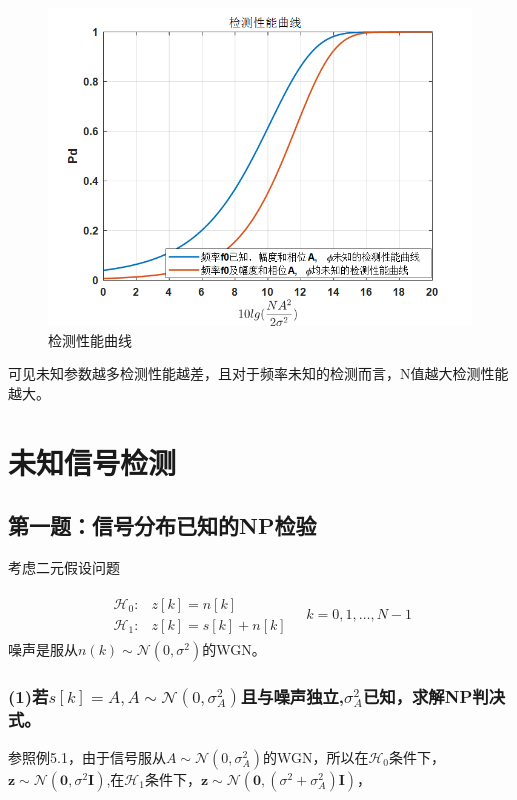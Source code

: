 \documentclass[fontset=windows]{article}
\numberwithin{figure}{section}
\begin{document}
\begin{figure}[H]
	\centering
	\includegraphics[scale=0.7]{4.3.png}
	\caption{检测性能曲线}
	\label{6.4.3}
\end{figure}

可见未知参数越多检测性能越差，且对于频率未知的检测而言，N值越大检测性能越大。

\section{未知信号检测}
\subsection{第一题：信号分布已知的NP检验}
考虑二元假设问题

\begin{align*}
	\begin{matrix}
		\mathcal{H}_0: & z[k]=n[k]      \\
		\mathcal{H}_1: & z[k]=s[k]+n[k]
	\end{matrix}\quad k=0,1,\ldots,N-1
\end{align*}
噪声是服从\(n(k)\sim \mathcal{N}(0,\sigma^2)\)的WGN。

\subsubsection*{(1)若\(s[k]=A,A\sim \mathcal{N}(0,\sigma^2_A)\)且与噪声独立,\(\sigma^2_A\)已知，求解NP判决式。}

参照例5.1，由于信号服从\(A\sim \mathcal{N}(0,\sigma^2_A)\)的WGN，所以在\(\mathcal{H}_0\)条件下，\(\mathbf{z}\sim \mathcal{N}(\mathbf{0},\sigma^2\mathbf{I})\),在\(\mathcal{H}_1\)条件下，\(\mathbf{z}\sim \mathcal{N}(\mathbf{0},(\sigma^2+\sigma^2_A)\mathbf{I})\)，
\end{document}
